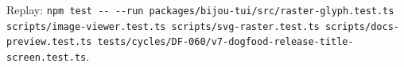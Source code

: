 \begin{itemize}
  Replay: \texttt{n\allowbreak{}p\allowbreak{}m\allowbreak{} \allowbreak{}t\allowbreak{}e\allowbreak{}s\allowbreak{}t\allowbreak{} \allowbreak{}-\allowbreak{}-\allowbreak{} \allowbreak{}-\allowbreak{}-\allowbreak{}r\allowbreak{}u\allowbreak{}n\allowbreak{} \allowbreak{}p\allowbreak{}a\allowbreak{}c\allowbreak{}k\allowbreak{}a\allowbreak{}g\allowbreak{}e\allowbreak{}s\allowbreak{}/\allowbreak{}b\allowbreak{}i\allowbreak{}j\allowbreak{}o\allowbreak{}u\allowbreak{}-\allowbreak{}t\allowbreak{}u\allowbreak{}i\allowbreak{}/\allowbreak{}s\allowbreak{}r\allowbreak{}c\allowbreak{}/\allowbreak{}r\allowbreak{}a\allowbreak{}s\allowbreak{}t\allowbreak{}e\allowbreak{}r\allowbreak{}-\allowbreak{}g\allowbreak{}l\allowbreak{}y\allowbreak{}p\allowbreak{}h\allowbreak{}.\allowbreak{}t\allowbreak{}e\allowbreak{}s\allowbreak{}t\allowbreak{}.\allowbreak{}t\allowbreak{}s\allowbreak{} \allowbreak{}s\allowbreak{}c\allowbreak{}r\allowbreak{}i\allowbreak{}p\allowbreak{}t\allowbreak{}s\allowbreak{}/\allowbreak{}i\allowbreak{}m\allowbreak{}a\allowbreak{}g\allowbreak{}e\allowbreak{}-\allowbreak{}v\allowbreak{}i\allowbreak{}e\allowbreak{}w\allowbreak{}e\allowbreak{}r\allowbreak{}.\allowbreak{}t\allowbreak{}e\allowbreak{}s\allowbreak{}t\allowbreak{}.\allowbreak{}t\allowbreak{}s\allowbreak{} \allowbreak{}s\allowbreak{}c\allowbreak{}r\allowbreak{}i\allowbreak{}p\allowbreak{}t\allowbreak{}s\allowbreak{}/\allowbreak{}s\allowbreak{}v\allowbreak{}g\allowbreak{}-\allowbreak{}r\allowbreak{}a\allowbreak{}s\allowbreak{}t\allowbreak{}e\allowbreak{}r\allowbreak{}.\allowbreak{}t\allowbreak{}e\allowbreak{}s\allowbreak{}t\allowbreak{}.\allowbreak{}t\allowbreak{}s\allowbreak{} \allowbreak{}s\allowbreak{}c\allowbreak{}r\allowbreak{}i\allowbreak{}p\allowbreak{}t\allowbreak{}s\allowbreak{}/\allowbreak{}d\allowbreak{}o\allowbreak{}c\allowbreak{}s\allowbreak{}-\allowbreak{}p\allowbreak{}r\allowbreak{}e\allowbreak{}v\allowbreak{}i\allowbreak{}e\allowbreak{}w\allowbreak{}.\allowbreak{}t\allowbreak{}e\allowbreak{}s\allowbreak{}t\allowbreak{}.\allowbreak{}t\allowbreak{}s\allowbreak{} \allowbreak{}t\allowbreak{}e\allowbreak{}s\allowbreak{}t\allowbreak{}s\allowbreak{}/\allowbreak{}c\allowbreak{}y\allowbreak{}c\allowbreak{}l\allowbreak{}e\allowbreak{}s\allowbreak{}/\allowbreak{}D\allowbreak{}F\allowbreak{}-\allowbreak{}0\allowbreak{}6\allowbreak{}0\allowbreak{}/\allowbreak{}v\allowbreak{}7\allowbreak{}-\allowbreak{}d\allowbreak{}o\allowbreak{}g\allowbreak{}f\allowbreak{}o\allowbreak{}o\allowbreak{}d\allowbreak{}-\allowbreak{}r\allowbreak{}e\allowbreak{}l\allowbreak{}e\allowbreak{}a\allowbreak{}s\allowbreak{}e\allowbreak{}-\allowbreak{}t\allowbreak{}i\allowbreak{}t\allowbreak{}l\allowbreak{}e\allowbreak{}-\allowbreak{}s\allowbreak{}c\allowbreak{}r\allowbreak{}e\allowbreak{}e\allowbreak{}n\allowbreak{}.\allowbreak{}t\allowbreak{}e\allowbreak{}s\allowbreak{}t\allowbreak{}.\allowbreak{}t\allowbreak{}s}.

\end{itemize}
